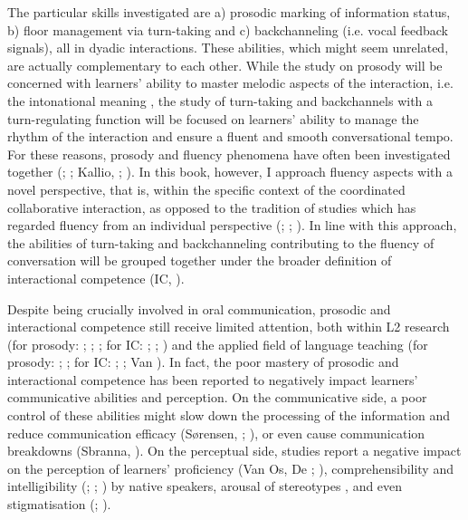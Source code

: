 The particular skills investigated are a) prosodic marking of information status, b) floor management via turn-taking and c) backchanneling (i.e. vocal feedback signals), all in dyadic interactions. These abilities, which might seem unrelated, are actually complementary to each other. While the study on prosody will be concerned with learners’ ability to master melodic aspects of the interaction, i.e. the intonational meaning \citep{Wennerstrom2006}, the study of turn-taking and backchannels with a turn-regulating function will be focused on learners’ ability to manage the rhythm of the interaction and ensure a fluent and smooth conversational tempo. For these reasons, prosody and fluency phenomena have often been investigated together (\citealt{TrofimovichBaker2007}; \citealt{TsengEtAl2005}; Kallio, \citealt{KautonenKuronen2023}; \citealt{Ashby2016}). In this book, however, I approach fluency aspects with a novel perspective, that is, within the specific context of the coordinated collaborative interaction, as opposed to the tradition of studies which has regarded fluency from an individual perspective (\citealt{TavakoliSkehan2005}; \citealt{Segalowitz2010}; \citealt{Kormos2006}). In line with this approach, the abilities of turn-taking and backchanneling contributing to the fluency of conversation will be grouped together under the broader definition of interactional competence (IC, \citealt{Young2014}).

Despite being crucially involved in oral communication, prosodic and interactional competence still receive limited attention, both within L2 research (for prosody: \citealt{DerwingMunro2015}; \citealt{Gut2009}; \citealt{Mennen2004}; for IC: \citealt{Cekaite2007}; \citealt{Galaczi2014}; \citealt{YamamotoEtAl2015}) and the applied field of language teaching (for prosody: \citealt{Aronsson2014}; \citealt{PiccardoNorth2017}; for IC: \citealt{Campbell-Larsen2022}; \citealt{Cohen2005}; Van \citealt{CompernolleSoria2020}). In fact, the poor mastery of prosodic and interactional competence has been reported to negatively impact learners’ communicative abilities and perception. On the communicative side, a poor control of these abilities might slow down the processing of the information and reduce communication efficacy (Sørensen, \citealt{FereczkowskiMacDonald2019}; \citealt{SongIverson2018}), or even cause communication breakdowns (Sbranna, \citealt{CangemiGrice2021}). On the perceptual side, studies report a negative impact on the perception of learners’ proficiency (Van Os, De \citealt{JongBosker2020}; \citealt{TrofimovichBaker2007}), comprehensibility and intelligibility (\citealt{MunroDerwing1999}; \citealt{Kang2010}; \citealt{Hahn2004}) by native speakers, arousal of stereotypes \citep{Nakane2007}, and even stigmatisation (\citealt{Munro2003}; \citealt{Piske2012}).

